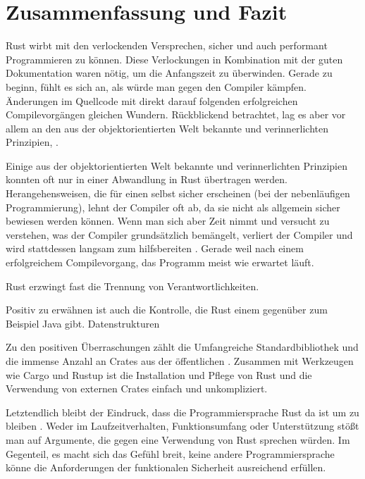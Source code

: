 \chapter{Zusammenfassung und Fazit}

Rust wirbt mit den verlockenden Versprechen, sicher und auch performant Programmieren zu können.
Diese Verlockungen in Kombination mit der guten Dokumentation waren nötig, um die Anfangszeit zu überwinden.
Gerade zu beginn, fühlt es sich an, als würde man gegen den Compiler kämpfen.
Änderungen im Quellcode mit direkt darauf folgenden erfolgreichen Compilevorgängen gleichen Wundern.
Rückblickend betrachtet, lag es aber vor allem an den aus der objektorientierten Welt bekannte und verinnerlichten Prinzipien, .

Einige aus der objektorientierten Welt bekannte und verinnerlichten Prinzipien konnten oft nur in einer Abwandlung in Rust übertragen werden.
Herangehensweisen, die für einen selbst sicher erscheinen (bei der nebenläufigen Programmierung), lehnt der Compiler oft ab, da sie nicht als allgemein sicher bewiesen werden können.
Wenn man sich aber Zeit nimmt und versucht zu verstehen, was der Compiler grundsätzlich bemängelt, verliert der Compiler  und wird stattdessen langsam zum hilfsbereiten .
Gerade weil nach einem erfolgreichem Compilevorgang, das Programm meist wie erwartet läuft.

Rust erzwingt fast die Trennung von Verantwortlichkeiten.


Positiv zu erwähnen ist auch die Kontrolle, die Rust einem gegenüber zum Beispiel Java gibt.
Datenstrukturen

Zu den positiven Überraschungen zählt die Umfangreiche Standardbibliothek und die immense Anzahl an Crates aus der öffentlichen .
Zusammen mit Werkzeugen wie Cargo und Rustup ist die Installation und Pflege von Rust und die Verwendung von externen Crates  einfach und unkompliziert.

Letztendlich bleibt der Eindruck, dass die Programmiersprache Rust da ist um zu bleiben .
Weder im Laufzeitverhalten, Funktionsumfang oder Unterstützung stößt man auf Argumente, die gegen eine Verwendung von Rust sprechen würden.
Im Gegenteil, es macht sich das Gefühl breit, keine andere Programmiersprache könne die Anforderungen der funktionalen Sicherheit ausreichend erfüllen.








